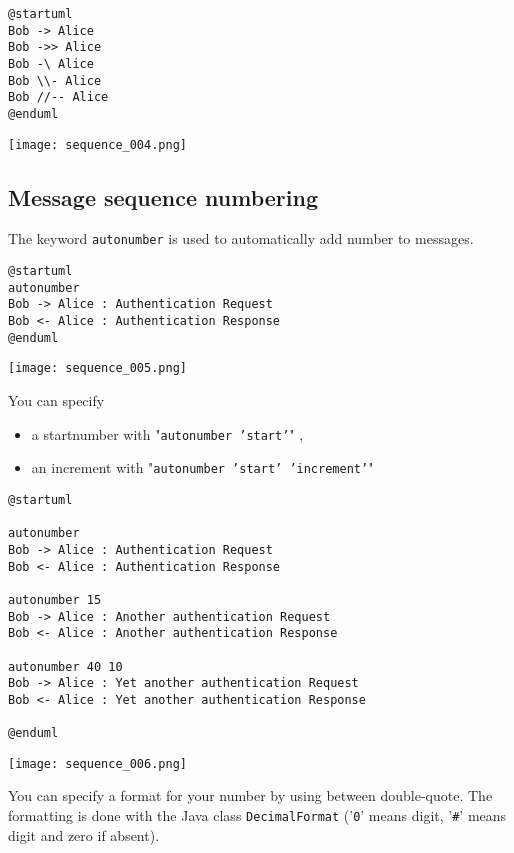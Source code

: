 \begin{lstlisting}
@startuml
Bob -> Alice
Bob ->> Alice
Bob -\ Alice
Bob \\- Alice
Bob //-- Alice
@enduml
\end{lstlisting}

\begin{center}
\texttt{[image: sequence\_004.png]}
\end{center}


\newpage \subsection{Message sequence numbering}

The keyword \texttt{autonumber} is used to automatically add number to messages.

\begin{lstlisting}
@startuml
autonumber
Bob -> Alice : Authentication Request
Bob <- Alice : Authentication Response
@enduml
\end{lstlisting}
\begin{center}
\texttt{[image: sequence\_005.png]}
\end{center}


You can specify 
\begin{itemize}
  \item a startnumber with "\texttt{autonumber 'start'}" ,
  \item an increment with "\texttt{autonumber 'start' 'increment'}"
\end{itemize}


\begin{lstlisting}
@startuml

autonumber
Bob -> Alice : Authentication Request
Bob <- Alice : Authentication Response

autonumber 15
Bob -> Alice : Another authentication Request
Bob <- Alice : Another authentication Response

autonumber 40 10
Bob -> Alice : Yet another authentication Request
Bob <- Alice : Yet another authentication Response

@enduml
\end{lstlisting}
\begin{center}
\texttt{[image: sequence\_006.png]}
\end{center}
\newpage
You can specify a format for your number by using between double-quote.
The formatting is done with the Java class \texttt{DecimalFormat} ('\texttt{0}' means digit,
'\texttt{\#}' means digit and zero if absent).

